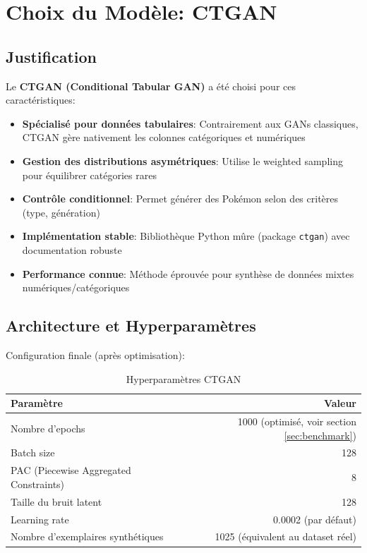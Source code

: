 \documentclass[11pt,a4paper]{article}
\begin{document}
\section{Choix du Modèle: CTGAN}

\subsection{Justification}

Le \textbf{CTGAN (Conditional Tabular GAN)} a été choisi pour ces caractéristiques:

\begin{itemize}
    \item \textbf{Spécialisé pour données tabulaires}: Contrairement aux GANs classiques, CTGAN gère nativement les colonnes catégoriques et numériques
    \item \textbf{Gestion des distributions asymétriques}: Utilise le weighted sampling pour équilibrer catégories rares
    \item \textbf{Contrôle conditionnel}: Permet générer des Pokémon selon des critères (type, génération) 
    \item \textbf{Implémentation stable}: Bibliothèque Python mûre (package \texttt{ctgan}) avec documentation robuste
    \item \textbf{Performance connue}: Méthode éprouvée pour synthèse de données mixtes numériques/catégoriques
\end{itemize}

\subsection{Architecture et Hyperparamètres}

Configuration finale (après optimisation):

\begin{table}[H]
\centering
\caption{Hyperparamètres CTGAN}
\begin{tabular}{lr}
\toprule
\textbf{Paramètre} & \textbf{Valeur} \\
\midrule
Nombre d'epochs & 1000 (optimisé, voir section \ref{sec:benchmark}) \\
Batch size & 128 \\
PAC (Piecewise Aggregated Constraints) & 8 \\
Taille du bruit latent & 128 \\
Learning rate & 0.0002 (par défaut) \\
Nombre d'exemplaires synthétiques & 1025 (équivalent au dataset réel) \\
\bottomrule
\end{tabular}
\end{table}
\end{document}
